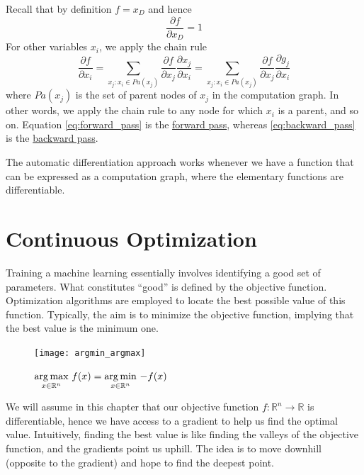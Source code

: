 \documentclass{article}
\begin{document}
Recall that by definition $f=x_D$ and hence
$$\frac{\partial{f}}{\partial{x_D}}=1$$
For other variables $x_i$, we apply the chain rule 
\begin{equation}\label{eq:backward_pass}
    \frac{\partial{f}}{\partial{x_i}}=\displaystyle\sum_{x_j:x_i\in
    Pa(x_j)}\frac{\partial{f}}{\partial{x_j}}\frac{\partial{x_j}}{\partial{x_i}}=\displaystyle\sum_{x_j:x_i\in
    Pa(x_j)}\frac{\partial{f}}{\partial{x_j}}\frac{\partial{g_j}}{\partial{x_i}}
\end{equation}
where $Pa(x_j)$ is the set of parent nodes of $x_j$ in the computation graph.
In other words, we apply the chain rule to any node for which $x_i$ is a
parent, and so on. Equation \ref{eq:forward_pass} is the \underline{forward
pass}, whereas \ref{eq:backward_pass} is the \underline{backward pass}.

The automatic differentiation approach works whenever we have a function that
can be expressed as a computation graph, where the elementary functions are
differentiable. 
\cleardoublepage
\section{Continuous Optimization}
Training a machine learning essentially involves identifying a good set of
parameters. What constitutes ``good'' is defined by the objective function.
Optimization algorithms are employed to locate the best possible value of this
function. Typically, the aim is to minimize the objective function, implying
that the best value is the minimum one.

\begin{figure}[!h]
   \centering
   \texttt{[image: argmin\_argmax]}
   \caption{$\underset{x\in \mathbb{R}^n}{\operatorname*{arg\,max}}\
   f(x)=\underset{x\in\mathbb{R}^n}{\operatorname*{arg\,min}}\ {-f(x)}$}
\end{figure}

We will assume in this chapter that our objective function $f:\mathbb{R}^n\to
\mathbb{R}$ is differentiable, hence we have access to a gradient to help us
find the optimal value. Intuitively, finding the best value is like finding
the valleys of the objective function, and the gradients point us uphill. The
idea is to move downhill (opposite to the gradient) and hope to find the
deepest point.
\end{document}
